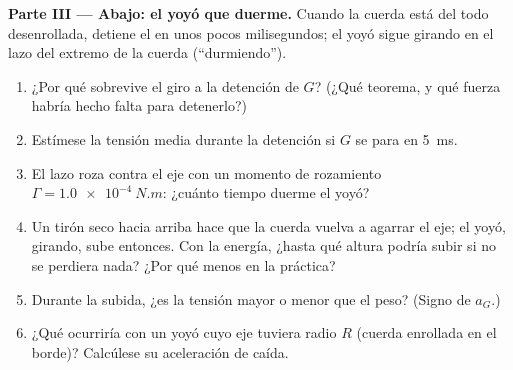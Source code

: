 \begin{problem}
\medskip
\noindent\textbf{Parte III --- Abajo: el yoyó que duerme.}
Cuando la cuerda está del todo desenrollada, detiene el  en
unos pocos milisegundos; el yoyó sigue girando en el lazo del extremo de
la cuerda (``durmiendo'').
\begin{enumerate}[resume]
  \item ¿Por qué sobrevive el giro a la detención de $G$? (¿Qué teorema, y
        qué fuerza habría hecho falta para detenerlo?)
  \item Estímese la tensión media durante la detención si $G$ se para en
        \qty{5}{ms}.
  \item El lazo roza contra el eje con un momento de rozamiento $\Gamma =
        \qty{1.0e-4}{N.m}$: ¿cuánto tiempo duerme el yoyó?
  \item Un tirón seco hacia arriba hace que la cuerda vuelva a agarrar el
        eje; el yoyó, girando, sube entonces. Con la energía, ¿hasta qué
        altura podría subir si no se perdiera nada? ¿Por qué menos en la
        práctica?
  \item Durante la subida, ¿es la tensión mayor o menor que el peso?
        (Signo de $a_G$.)
  \item ¿Qué ocurriría con un yoyó cuyo eje tuviera radio $R$ (cuerda
        enrollada en el borde)? Calcúlese su aceleración de caída.
\end{enumerate}


\end{problem}
